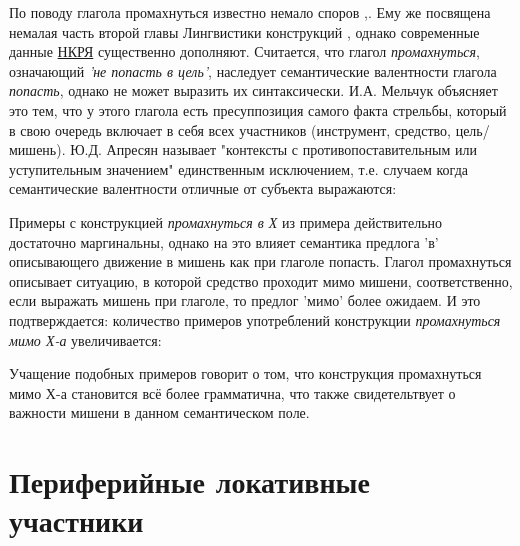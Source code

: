 По поводу глагола промахнуться известно немало споров \citep[148]{апресян1995избранные},\citep[135]{мельчук1974опыт}. Ему же посвящена немалая часть второй главы Лингвистики конструкций \citep[315-317]{рахилина2010лингвистика}, однако современные данные \hyperlink{rusc}{НКРЯ} существенно дополняют. Считается, что глагол \textit{промахнуться}, означающий \textit{'не попасть в цель'}, наследует семантические валентности глагола \textit{попасть}, однако не может выразить их синтаксически. И.А. Мельчук \citep{mel2004actants} объясняет это тем, что у этого глагола есть пресуппозиция самого факта стрельбы, который в свою очередь включает в себя всех участников (инструмент, средство, цель/мишень). Ю.Д. Апресян называет "контексты с противопоставительным или уступительным значением" единственным исключением, т.е. случаем когда семантические валентности отличные от субъекта выражаются:


Примеры с конструкцией \textit{промахнуться в Х} из примера  действительно достаточно маргинальны, однако на это влияет семантика предлога 'в' описывающего движение в мишень как при глаголе попасть. Глагол промахнуться описывает ситуацию, в которой средство проходит мимо мишени, соответственно, если выражать мишень при глаголе, то предлог 'мимо' более ожидаем. И это подтверждается: количество примеров употреблений конструкции \textit{промахнуться мимо Х-а} увеличивается:




Учащение подобных примеров говорит о том, что конструкция промахнуться мимо Х-а становится всё более грамматична, что также свидетельтвует о важности мишени в данном семантическом поле.

\section{Периферийные локативные участники}
